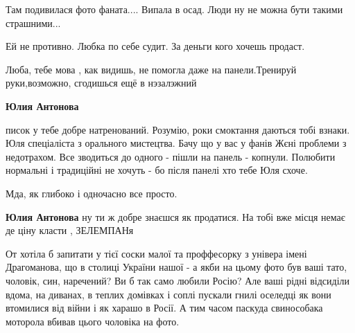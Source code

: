 \begin{itemize}
\begin{itemize}
Там подивилася фото фаната.... Випала в осад. Люди ну не можна бути такими страшними...

 
Ей не противно. Любка по себе судит. За деньги кого хочешь продаст.

 
Люба, тебе мова , как видишь, не помогла даже на панели.Тренируй руки,возможно, сгодишься ещё в нэзалэжний \Laughey[1.0][white]\Laughey[1.0][white]

 
\textbf{Юлия Антонова} 

писок у тебе добре натренований. Розумію, роки смоктання даються тобі взнаки.
Юля спеціаліста з орального мистецтва. Бачу що у вас у фанів Жєні проблеми з
недотрахом. Все зводиться до одного - пішли на панель - копнули. Полюбити
нормальні і традиційні не хочуть - бо після панелі хто тебе Юля схоче.

Мда, як глибоко і одночасно все просто.

 
\textbf{Юлия Антонова} ну ти ж добре знаєшся як продатися. На тобі вже місця немає де ціну класти , ЗЕЛЕМПАНя

 

От хотіла б запитати у тієї соски малої та проффесорку з універа імені
Драгоманова, що в столиці України нашої - а якби на цьому фото був ваші тато,
чоловік, син, наречений? Ви б так само любили Росію? Але ваші рідні відсиділи
вдома, на диванах, в теплих домівках і соплі пускали гнилі оселедці як вони
втомилися від війни і як харашо в Росії. А тим часом паскуда свинособака
моторола вбивав цього чоловіка на фото.

\end{itemize}


\end{itemize}
